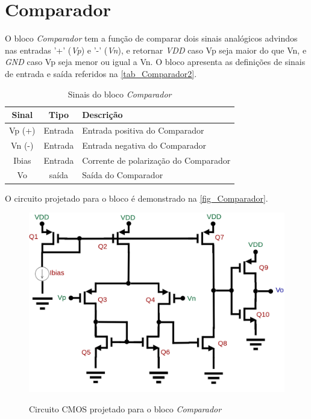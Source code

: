 \renewcommand{\NomeBloco}{\textit{Comparador}}
\renewcommand{\NomeBlocoNoIt}{Comparador}
\renewcommand{\NomePTab}{tab_\NomeBloco}
\renewcommand{\NomeSTab}{tab_\NomeBlocoNoIt2}
\renewcommand{\NomePFig}{fig_\NomeBlocoNoIt}
\renewcommand{\NomeSFig}{fig_\NomeBlocoNoIt2}
\renewcommand{\NomeTTab}{tab_\NomeBlocoNoIt3}

\section{Comparador}

O bloco \NomeBloco{} tem a função de comparar dois sinais anal\'ogicos advindos nas entradas '+' (\textit{Vp}) e '-' (\textit{Vn}), e retornar \textit{VDD} caso Vp seja maior do que Vn, e \textit{GND} caso Vp seja menor ou igual a Vn. O bloco apresenta as definições de sinais de entrada e sa\'ida referidos na \autoref{\NomeSTab}.

\begin{table}[htbp]
\caption{Sinais do bloco \NomeBloco}
\label{\NomeSTab}
\centering
\begin{tabular}{ccl}

    \toprule
    Sinal & Tipo    & Descrição        \\
    \midrule \midrule
    Vp (+) & Entrada & Entrada positiva do Comparador\\
    \midrule
    Vn (-) & Entrada & Entrada negativa do Comparador\\
    \midrule
    Ibias & Entrada & Corrente de polarização do Comparador\\
    \midrule
    Vo & sa\'ida & Sa\'ida do Comparador\\
    \bottomrule
\end{tabular}
\end{table}

O circuito projetado para o bloco \'e demonstrado na \autoref{\NomePFig}.

\begin{figure}[htb]
 \centering
    \centering
    \caption{Circuito CMOS projetado para o bloco \NomeBloco} 
    \includegraphics[scale=0.3]{Circuitos/Comparator.png}
    \label{\NomePFig}
\end{figure}

